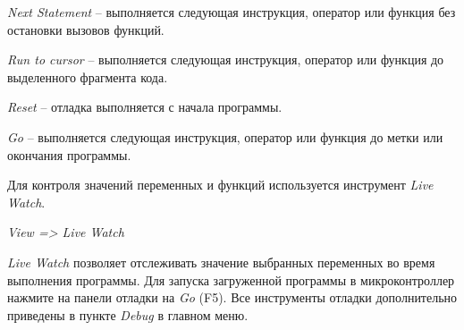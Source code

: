 \textit{Next Statement} -- выполняется следующая инструкция, оператор или функция без остановки вызовов функций.

\textit{Run to cursor} --  выполняется следующая инструкция, оператор или функция до выделенного фрагмента кода.

\textit{Reset} -- отладка выполняется с начала программы.

\textit{Go} -- выполняется следующая инструкция, оператор или функция до метки или окончания программы.

Для контроля значений переменных и функций используется инструмент \textit{Live Watch}. 
\begin{center}
\textit{View => Live Watch}
\end{center}
\textit{Live Watch} позволяет отслеживать значение выбранных переменных во время выполнения программы.
	Для запуска загруженной программы в микроконтроллер нажмите на панели отладки на \textit{Go} (F5).
	Все инструменты отладки дополнительно приведены в пункте \textit{Debug} в главном меню.




